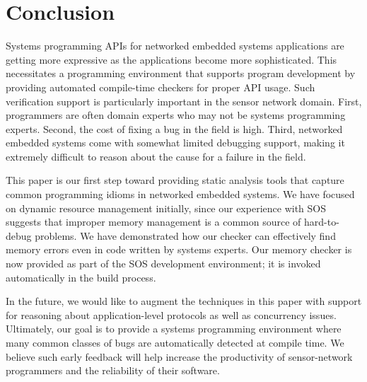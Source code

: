\section{Conclusion}
\label{sec:conc}

Systems programming APIs for networked embedded systems applications
are getting more expressive as the applications become more
sophisticated.  This necessitates a programming environment that
supports program development by providing automated compile-time
checkers for proper API usage.  Such verification support is
particularly important in the sensor network domain.  First,
programmers are often domain experts who may not be systems
programming experts. Second, the cost of fixing a bug in the field is
high.  Third, networked embedded systems come with somewhat limited
debugging support, making it extremely difficult to reason about the
cause for a failure in the field.

This paper is our first step toward providing static analysis tools
that capture common programming idioms in networked embedded systems.
We have focused on dynamic resource management initially, since our
experience with SOS suggests that improper memory management is a
common source of hard-to-debug problems.  We have demonstrated how our
checker can effectively find memory errors even in code written by
systems experts.  Our memory checker is now provided as part of the
SOS development environment; it is invoked automatically in the build
process.

In the future, we would like to augment the techniques in this paper
with support for reasoning about application-level protocols
\cite{AlurPOPL05,HJM05} as well as concurrency issues.  Ultimately,
our goal is to provide a systems programming environment where many
common classes of bugs are automatically detected at compile time.  We
believe such early feedback will help increase the productivity of
sensor-network programmers and the reliability of their software.



